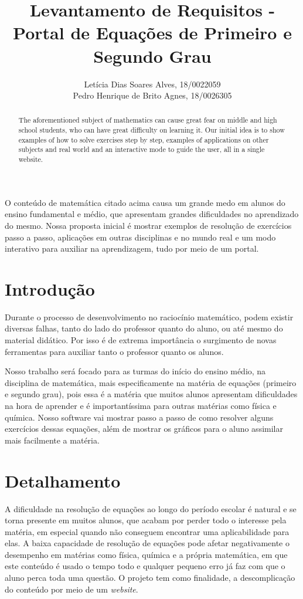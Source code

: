 \documentclass[12pt]{article}
\title{Levantamento de Requisitos - Portal de Equações de Primeiro e Segundo Grau}
\author{Letícia Dias Soares Alves, 18/0022059\\
	Pedro Henrique de Brito Agnes, 18/0026305
}
\begin{document}
\maketitle

\begin{abstract}
  The aforementioned subject of mathematics can cause great fear on middle and high school students, who can have great difficulty on learning it. Our initial idea is to show examples of how to solve exercises step by step, examples of applications on other subjects and real world and an interactive mode to guide the user, all in a single website.
\end{abstract}

\begin{resumo}
  O conteúdo de matemática citado acima causa um grande medo em alunos do ensino fundamental e médio, que apresentam grandes dificuldades no aprendizado do mesmo. Nossa proposta inicial é mostrar exemplos de resolução de exercícios passo a passo, aplicações em outras disciplinas e no mundo real e um modo interativo para auxiliar na aprendizagem, tudo por meio de um portal.
\end{resumo}

\section{Introdução}
Durante o processo de desenvolvimento no raciocínio matemático, podem existir diversas falhas, tanto do lado do professor quanto do aluno, ou até mesmo do material didático. Por isso é de extrema importância o surgimento de novas ferramentas para auxiliar tanto o professor quanto os alunos.

Nosso trabalho será focado para as turmas do início do ensino médio, na disciplina de matemática, mais especificamente na matéria de equações (primeiro e segundo grau), pois essa é a matéria que muitos alunos apresentam dificuldades na hora de aprender e é importantíssima para outras matérias como física e química. Nosso software vai mostrar passo a passo de como resolver alguns exercícios dessas equações, além de mostrar os gráficos para o aluno assimilar mais facilmente a matéria.

\section{Detalhamento}
A dificuldade na resolução de equações ao longo do período escolar é natural e se torna presente em muitos alunos, que acabam por perder todo o interesse pela matéria, em especial quando não conseguem encontrar uma aplicabilidade para elas. A baixa capacidade de resolução de equações pode afetar negativamente o desempenho em matérias como física, química e a própria matemática, em que este conteúdo é usado o tempo todo e qualquer pequeno erro já faz com que o aluno perca toda uma questão. O projeto tem como finalidade, a descomplicação do conteúdo por meio de um \textit{website}.
\end{document}
